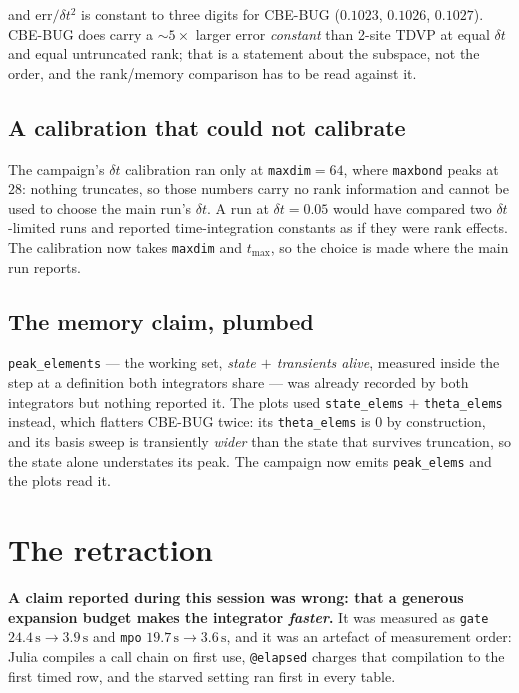 \documentclass[11pt,a4paper]{article}
\newcommand{\code}[1]{\texttt{\small #1}}
\begin{document}
\noindent
and $\mathrm{err}/\delta t^2$ is constant to three digits for CBE-BUG ($0.1023$, $0.1026$,
$0.1027$). CBE-BUG does carry a $\sim 5\times$ larger error \emph{constant} than 2-site TDVP at
equal $\delta t$ and equal untruncated rank; that is a statement about the subspace, not the
order, and the rank/memory comparison has to be read against it.

\subsection{A calibration that could not calibrate}

The campaign's $\delta t$ calibration ran only at \code{maxdim}$=64$, where \code{maxbond}
peaks at $28$: nothing truncates, so those numbers carry no rank information and cannot be used
to choose the main run's $\delta t$. A run at $\delta t = 0.05$ would have compared two
$\delta t$-limited runs and reported time-integration constants as if they were rank effects.
The calibration now takes \code{maxdim} and $t_{\max}$, so the choice is made where the main run
reports.

\subsection{The memory claim, plumbed}

\code{peak\_elements} --- the working set, \emph{state $+$ transients alive}, measured inside
the step at a definition both integrators share --- was already recorded by both integrators
but nothing reported it. The plots used \code{state\_elems} $+$ \code{theta\_elems} instead,
which flatters CBE-BUG twice: its \code{theta\_elems} is $0$ by construction, and its basis
sweep is transiently \emph{wider} than the state that survives truncation, so the state alone
understates its peak. The campaign now emits \code{peak\_elems} and the plots read it.

\section{The retraction}
\label{sec:retraction}

\textbf{A claim reported during this session was wrong: that a generous expansion budget makes
the integrator \emph{faster}.} It was measured as \code{gate} $24.4\,\mathrm{s} \to
3.9\,\mathrm{s}$ and \code{mpo} $19.7\,\mathrm{s}\to 3.6\,\mathrm{s}$, and it was an artefact
of measurement order: Julia compiles a call chain on first use, \code{@elapsed} charges that
compilation to the first timed row, and the starved setting ran first in every table.
\end{document}
